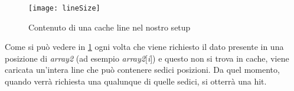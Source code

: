 		\begin{figure}
			\begin{center}
				\texttt{[image: lineSize]}
				\caption{Contenuto di una cache line nel nostro setup}
				\label{fig:lineSize}
			\end{center}
		\end{figure}
		
		Come si può vedere in \cref{fig:lineSize} ogni volta che viene richiesto il dato presente in una posizione di \emph{array2} (ad esempio \emph{array2}$[$\emph{i}$]$) e questo non si trova in cache, viene caricata un'intera line che può contenere sedici posizioni. Da quel momento, quando verrà richiesta una qualunque di quelle sedici, si otterrà una hit.
		 